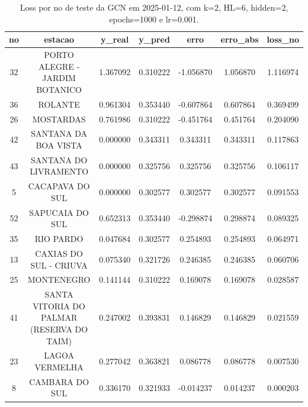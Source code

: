 \begin{table}[h]
\centering
\caption{Loss por no de teste da GCN em 2025-01-12, com k=2, HL=6, hidden=2, epochs=1000 e lr=0.001.}
\label{tab:gcn_loss_k2_hl6_h2_e1000_d20250112}
\begin{tabular}{ccccccc}
\toprule
no & estacao & y\_real & y\_pred & erro & erro\_abs & loss\_no \\
\midrule
32 & PORTO ALEGRE - JARDIM BOTANICO & 1.367092 & 0.310222 & -1.056870 & 1.056870 & 1.116974 \\
36 & ROLANTE & 0.961304 & 0.353440 & -0.607864 & 0.607864 & 0.369499 \\
26 & MOSTARDAS & 0.761986 & 0.310222 & -0.451764 & 0.451764 & 0.204090 \\
42 & SANTANA DA BOA VISTA & 0.000000 & 0.343311 & 0.343311 & 0.343311 & 0.117863 \\
43 & SANTANA DO LIVRAMENTO & 0.000000 & 0.325756 & 0.325756 & 0.325756 & 0.106117 \\
5 & CACAPAVA DO SUL & 0.000000 & 0.302577 & 0.302577 & 0.302577 & 0.091553 \\
52 & SAPUCAIA DO SUL & 0.652313 & 0.353440 & -0.298874 & 0.298874 & 0.089325 \\
35 & RIO PARDO & 0.047684 & 0.302577 & 0.254893 & 0.254893 & 0.064971 \\
13 & CAXIAS DO SUL - CRIUVA & 0.075340 & 0.321726 & 0.246385 & 0.246385 & 0.060706 \\
25 & MONTENEGRO & 0.141144 & 0.310222 & 0.169078 & 0.169078 & 0.028587 \\
41 & SANTA VITORIA DO PALMAR (RESERVA DO TAIM) & 0.247002 & 0.393831 & 0.146829 & 0.146829 & 0.021559 \\
23 & LAGOA VERMELHA & 0.277042 & 0.363821 & 0.086778 & 0.086778 & 0.007530 \\
8 & CAMBARA DO SUL & 0.336170 & 0.321933 & -0.014237 & 0.014237 & 0.000203 \\
\bottomrule
\end{tabular}
\end{table}
